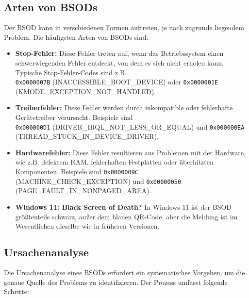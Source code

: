 \documentclass[paper=a4,fontsize=12pt,ngerman,parskip=half]{scrartcl}
\begin{document}
\subsection{Arten von BSODs}

Der BSOD kann in verschiedenen Formen auftreten, je nach zugrunde liegendem Problem. Die häufigsten Arten von BSODs sind:

\begin{itemize}
  \item \textbf{Stop-Fehler:} Diese Fehler treten auf, wenn das Betriebssystem einen schwerwiegenden Fehler entdeckt, von dem es sich nicht erholen kann. Typische Stop-Fehler-Codes sind z.B.
        \\\texttt{0x0000007B} (INACCESSIBLE\_BOOT\_DEVICE) oder \texttt{0x0000001E}
        \\(KMODE\_EXCEPTION\_NOT\_HANDLED).\cite{microsoft_support}
  \item \textbf{Treiberfehler:} Diese Fehler werden durch inkompatible oder fehlerhafte Gerätetreiber verursacht. Beispiele sind
        \\\texttt{0x000000D1} (DRIVER\_IRQL\_NOT\_LESS\_OR\_EQUAL) und \texttt{0x000000EA}
        \\(THREAD\_STUCK\_IN\_DEVICE\_DRIVER).\cite{malwarebytes}
  \item \textbf{Hardwarefehler:} Diese Fehler resultieren aus Problemen mit der Hardware, wie z.B. defektem RAM, fehlerhaften Festplatten oder überhitzten Komponenten. Beispiele sind \texttt{0x0000009C} (MACHINE\_CHECK\_EXCEPTION) und \texttt{0x00000050} (PAGE\_FAULT\_IN\_NONPAGED\_AREA).
  \item \textbf{Windows 11: Black Screen of Death?} In Windows 11 ist der BSOD größtenteils schwarz, außer dem blauen QR-Code, aber die Meldung ist im Wesentlichen dieselbe wie in früheren Versionen.\cite{microsoft_forum}
\end{itemize}

\subsection{Ursachenanalyse}

Die Ursachenanalyse eines BSODs erfordert ein systematisches Vorgehen, um die genaue Quelle des Problems zu identifizieren. Der Prozess umfasst folgende Schritte:
\end{document}
